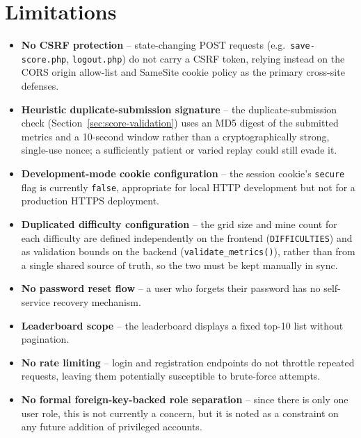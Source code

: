 \chapter{Limitations}
\label{ch:limitations}

\begin{itemize}[nosep]
    \item \textbf{No CSRF protection} -- state-changing POST requests
    (e.g.\ \texttt{save-score.php}, \texttt{logout.php}) do not carry a CSRF
    token, relying instead on the CORS origin allow-list and SameSite
    cookie policy as the primary cross-site defenses.
    \item \textbf{Heuristic duplicate-submission signature} -- the
    duplicate-submission check (Section~\ref{sec:score-validation}) uses an
    MD5 digest of the submitted metrics and a 10-second window rather than a
    cryptographically strong, single-use nonce; a sufficiently patient or
    varied replay could still evade it.
    \item \textbf{Development-mode cookie configuration} -- the session
    cookie's \texttt{secure} flag is currently \texttt{false}, appropriate
    for local HTTP development but not for a production HTTPS deployment.
    \item \textbf{Duplicated difficulty configuration} -- the grid size and
    mine count for each difficulty are defined independently on the
    frontend (\texttt{DIFFICULTIES}) and as validation bounds on the backend
    (\texttt{validate\_metrics()}), rather than from a single shared source
    of truth, so the two must be kept manually in sync.
    \item \textbf{No password reset flow} -- a user who forgets their
    password has no self-service recovery mechanism.
    \item \textbf{Leaderboard scope} -- the leaderboard displays a fixed
    top-10 list without pagination.
    \item \textbf{No rate limiting} -- login and registration endpoints do
    not throttle repeated requests, leaving them potentially susceptible to
    brute-force attempts.
    \item \textbf{No formal foreign-key-backed role separation} -- since
    there is only one user role, this is not currently a concern, but it is
    noted as a constraint on any future addition of privileged accounts.
\end{itemize}
